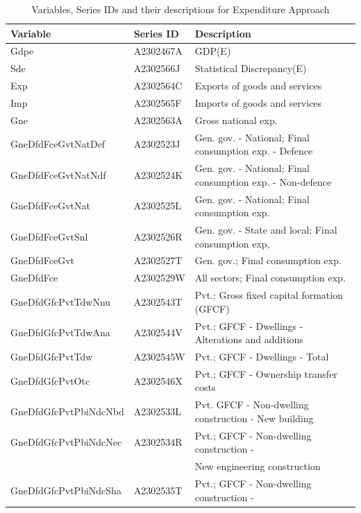 \documentclass[graybox]{svmult}
\begin{document}
\begin{table}
	\caption{Variables, Series IDs and their descriptions for Expenditure Approach}
	\small
	\centering
	\begin{tabular*}{\columnwidth}[width = \textwidth]{lll}
		\toprule
		\textbf{Variable} & \textbf{Series ID} & \textbf{Description}\\
		\midrule
    Gdpe                  & A2302467A & GDP(E)\\
    Sde                   & A2302566J & Statistical Discrepancy(E)\\
    Exp                   & A2302564C & Exports of goods and services\\
    Imp                   & A2302565F & Imports of goods and services\\
    Gne                   & A2302563A & Gross national exp.\\
		\addlinespace
    GneDfdFceGvtNatDef    & A2302523J & Gen. gov. - National; Final consumption exp. - Defence\\
    GneDfdFceGvtNatNdf    & A2302524K & Gen. gov. - National; Final consumption exp. - Non-defence\\
    GneDfdFceGvtNat       & A2302525L & Gen. gov. - National; Final consumption exp.\\
    GneDfdFceGvtSnl       & A2302526R & Gen. gov. - State and local; Final consumption exp,\\
    GneDfdFceGvt          & A2302527T & Gen. gov.; Final consumption exp.\\
		\addlinespace
    GneDfdFce             & A2302529W & All sectors; Final consumption exp.\\
    GneDfdGfcPvtTdwNnu    & A2302543T & Pvt.; Gross fixed capital formation (GFCF)\\
    GneDfdGfcPvtTdwAna    & A2302544V & Pvt.; GFCF - Dwellings - Alterations and additions\\
    GneDfdGfcPvtTdw       & A2302545W & Pvt.; GFCF - Dwellings - Total\\
    GneDfdGfcPvtOtc       & A2302546X & Pvt.; GFCF - Ownership transfer costs\\
		\addlinespace
    GneDfdGfcPvtPbiNdcNbd & A2302533L & Pvt. GFCF - Non-dwelling construction - New building\\
    GneDfdGfcPvtPbiNdcNec & A2302534R & Pvt.; GFCF - Non-dwelling construction -\\
                          &           & New engineering construction\\
    GneDfdGfcPvtPbiNdcSha & A2302535T & Pvt.; GFCF - Non-dwelling construction -\\

\end{tabular*}
\end{table}
\end{document}

